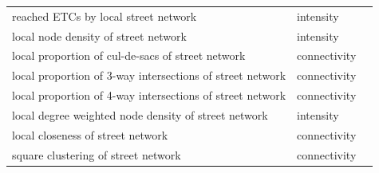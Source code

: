 \documentclass[fleqn,10pt]{wlscirep}
\begin{document}
\begin{longtable}{lll}
                    reached ETCs by local street network &    intensity &  \cite{fleischmann2021} \\
                    local node density of street network &    intensity &  \cite{fleischmann2021} \\
        local proportion of cul-de-sacs of street network & connectivity &        \cite{lowry2014} \\
    local proportion of 3-way intersections of street network & connectivity &       \cite{boeing2018} \\
    local proportion of 4-way intersections of street network & connectivity &       \cite{boeing2018} \\
    local degree weighted node density of street network &    intensity & \cite{dibble2019origin} \\
                        local closeness of street network & connectivity &        \cite{porta2006} \\
                    square clustering of street network & connectivity &  \cite{fleischmann2021} \\
\end{longtable}
\end{document}
